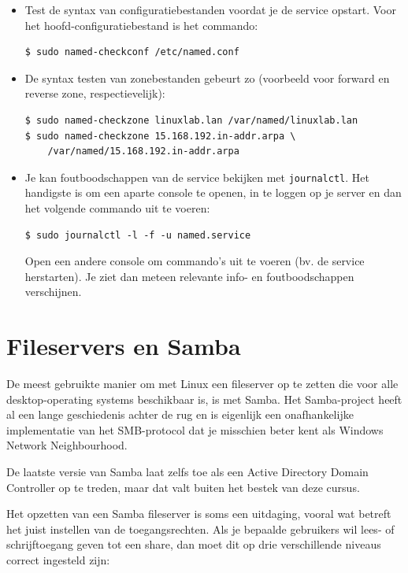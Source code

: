 \begin{itemize}
  \item Test de syntax van configuratiebestanden voordat je de service opstart. Voor het hoofd-configuratiebestand  is het commando:
    \begin{verbatim}
$ sudo named-checkconf /etc/named.conf
    \end{verbatim}
  \item De syntax testen van zonebestanden gebeurt zo (voorbeeld voor forward en reverse zone, respectievelijk):

    \begin{verbatim}
$ sudo named-checkzone linuxlab.lan /var/named/linuxlab.lan
$ sudo named-checkzone 15.168.192.in-addr.arpa \
    /var/named/15.168.192.in-addr.arpa
    \end{verbatim}

\item Je kan foutboodschappen van de service bekijken met \texttt{journalctl}. Het handigste is om een aparte console te openen, in te loggen op je server en dan het volgende commando uit te voeren:

    \begin{verbatim}
$ sudo journalctl -l -f -u named.service
    \end{verbatim}

  Open een andere console om commando's uit te voeren (bv. de service herstarten). Je ziet dan meteen relevante info- en foutboodschappen verschijnen.
\end{itemize}

\section{Fileservers en Samba}
\label{sec:fileservers-en-samba}

De meest gebruikte manier om met Linux een fileserver op te zetten die voor alle desktop-operating systems beschikbaar is, is met Samba. Het Samba-project heeft al een lange geschiedenis achter de rug en is eigenlijk een onafhankelijke implementatie van het SMB-protocol dat je misschien beter kent als Windows Network Neighbourhood.

De laatste versie van Samba laat zelfs toe als een Active Directory Domain Controller op te treden, maar dat valt buiten het bestek van deze cursus.

Het opzetten van een Samba fileserver is soms een uitdaging, vooral wat betreft het juist instellen van de toegangsrechten. Als je bepaalde gebruikers wil lees- of schrijftoegang geven tot een share, dan moet dit op drie verschillende niveaus correct ingesteld zijn:

